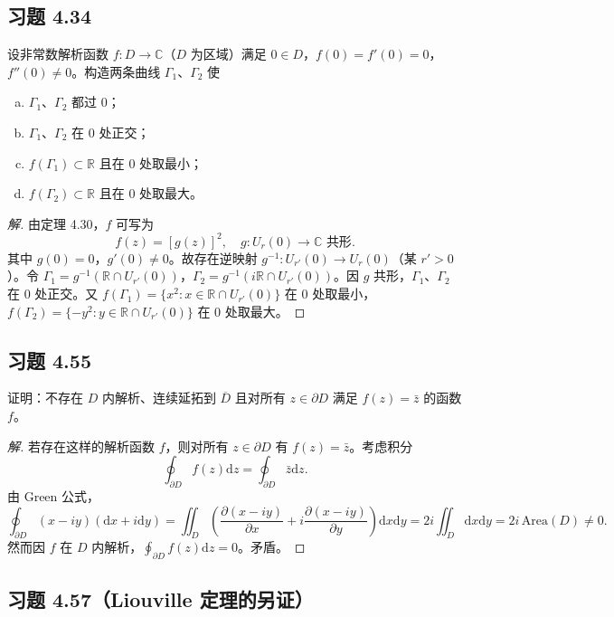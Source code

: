 \documentclass[11pt,a4paper]{article}
\newcommand{\R}{\mathbb{R}}
\newcommand{\C}{\mathbb{C}}
\newcommand{\dd}{\mathrm{d}}
\theoremstyle{definition}
\newenvironment{solution}{\begin{proof}[解]}{\end{proof}}
\begin{document}
\subsection{习题 4.34}

设非常数解析函数 $f : D \to \C$（$D$ 为区域）满足 $0 \in D$，$f(0) = f'(0) = 0$，$f''(0) \ne 0$。构造两条曲线 $\Gamma_1$、$\Gamma_2$ 使
\begin{enumerate}[(a)]
  \item $\Gamma_1$、$\Gamma_2$ 都过 $0$；
  \item $\Gamma_1$、$\Gamma_2$ 在 $0$ 处正交；
  \item $f(\Gamma_1) \subset \R$ 且在 $0$ 处取最小；
  \item $f(\Gamma_2) \subset \R$ 且在 $0$ 处取最大。
\end{enumerate}

\begin{solution}
  由定理 4.30，$f$ 可写为
  \[
    f(z) = [g(z)]^2, \quad g: U_r(0) \to \C \text{ 共形}.
  \]
  其中 $g(0) = 0$，$g'(0) \ne 0$。故存在逆映射 $g^{-1} : U_{r'}(0) \to U_r(0)$（某 $r' > 0$）。令 $\Gamma_1 = g^{-1}(\R \cap U_{r'}(0))$，$\Gamma_2 = g^{-1}(i\R \cap U_{r'}(0))$。因 $g$ 共形，$\Gamma_1$、$\Gamma_2$ 在 $0$ 处正交。又 $f(\Gamma_1) = \{x^2 : x \in \R \cap U_{r'}(0)\}$ 在 $0$ 处取最小，$f(\Gamma_2) = \{-y^2 : y \in \R \cap U_{r'}(0)\}$ 在 $0$ 处取最大。
\end{solution}

\subsection{习题 4.55}

证明：不存在 $D$ 内解析、连续延拓到 $\overline{D}$ 且对所有 $z \in \partial D$ 满足 $f(z) = \bar{z}$ 的函数 $f$。

\begin{solution}
  若存在这样的解析函数 $f$，则对所有 $z \in \partial D$ 有 $f(z) = \bar{z}$。考虑积分
  \[
    \oint_{\partial D} f(z) \dd z = \oint_{\partial D} \bar{z} \dd z.
  \]
  由 Green 公式，
  \[
    \oint_{\partial D} (x-iy)(\dd x + i \dd y) = \iint_D
    \left(\frac{\partial (x-iy)}{\partial x} + i \frac{\partial
    (x-iy)}{\partial y}\right) \dd x \dd y = 2i \iint_D \dd x \dd y =
    2i\,\mathrm{Area}(D) \ne 0.
  \]
  然而因 $f$ 在 $D$ 内解析，$\oint_{\partial D} f(z) \dd z = 0$。矛盾。
\end{solution}

\subsection{习题 4.57（Liouville 定理的另证）}
\end{document}
